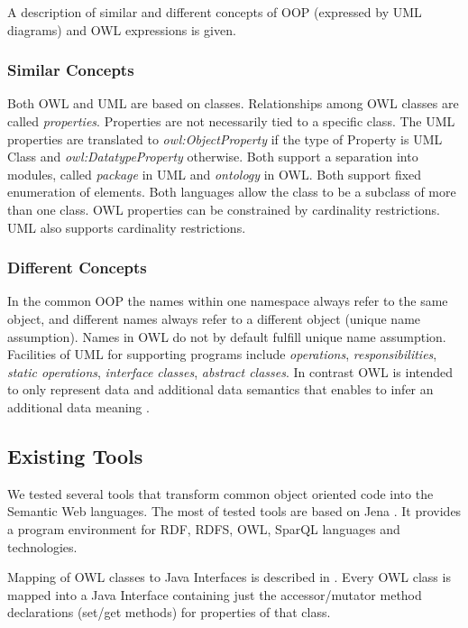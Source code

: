 \documentclass[conference]{IEEEtran}
\begin{document}
A description of similar and different concepts of OOP (expressed by UML diagrams) and OWL expressions is given.

\subsubsection{Similar Concepts}

Both OWL and UML are based on classes. Relationships among OWL classes are called \emph{properties}. Properties are not necessarily tied to a specific class. The UML properties are translated to \emph{owl:ObjectProperty} if the type of Property is UML Class and \emph{owl:DatatypeProperty} otherwise. Both support a separation into modules, called \emph{package} in UML and \emph{ontology} in OWL. Both support fixed enumeration of elements. Both languages allow the class to be a subclass of more than one class. OWL properties can be constrained by cardinality restrictions. UML also supports cardinality restrictions.

\subsubsection{Different Concepts}

In the common OOP the names within one namespace always refer to the same object, and different names always refer to a different object (unique name assumption). Names in OWL do not by default fulfill unique name assumption. Facilities of UML for supporting programs include \emph{operations}, \emph{responsibilities}, \emph{static operations}, \emph{interface classes}, \emph{abstract classes}. In contrast OWL is intended to only represent data and additional data semantics that enables to infer an additional data meaning \cite{ODM}.


\subsection{\label{Existing Tools}Existing Tools}

We tested several tools that transform common object oriented code into the Semantic Web languages. The most of tested tools are based on Jena \cite{Jena}. It provides a program environment
for RDF, RDFS, OWL, SparQL languages and technologies.

Mapping of OWL classes to Java Interfaces is described in \cite{mapping-owl-into-java}. Every OWL class is mapped into a Java Interface containing just the accessor/mutator method declarations (set/get methods) for properties of that class.
\end{document}
